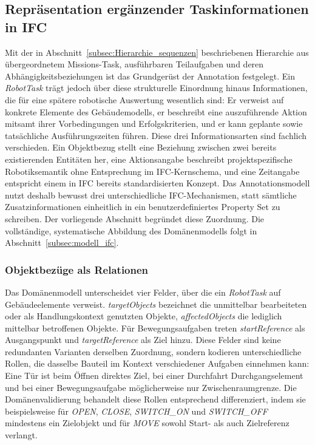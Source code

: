 \subsection{Repräsentation ergänzender Taskinformationen in IFC}\label{subsec:Taskinformationen}
Mit der in Abschnitt~\ref{subsec:Hierarchie_sequenzen} beschriebenen Hierarchie aus übergeordnetem Missions-Task, ausführbaren
Teilaufgaben und deren Abhängigkeitsbeziehungen ist das Grundgerüst der Annotation festgelegt. Ein
\textit{RobotTask} trägt jedoch über diese strukturelle Einordnung hinaus Informationen, die für
eine spätere robotische Auswertung wesentlich sind: Er verweist auf konkrete Elemente des
Gebäudemodells, er beschreibt eine auszuführende Aktion mitsamt ihrer Vorbedingungen und
Erfolgskriterien, und er kann geplante sowie tatsächliche Ausführungszeiten führen. Diese drei
Informationsarten sind fachlich verschieden. Ein Objektbezug stellt eine Beziehung zwischen zwei
bereits existierenden Entitäten her, eine Aktionsangabe beschreibt projektspezifische
Robotiksemantik ohne Entsprechung im IFC-Kernschema, und eine Zeitangabe entspricht einem in IFC
bereits standardisierten Konzept. Das Annotationsmodell nutzt deshalb bewusst drei unterschiedliche
IFC-Mechanismen, statt sämtliche Zusatzinformationen einheitlich in ein benutzerdefiniertes Property
Set zu schreiben. Der vorliegende Abschnitt begründet diese Zuordnung. Die vollständige,
systematische Abbildung des Domänenmodells folgt in Abschnitt~\ref{subsec:modell_ifc}.

\subsubsection{Objektbezüge als Relationen}
Das Domänenmodell unterscheidet vier Felder, über die ein \textit{RobotTask} auf Gebäudeelemente
verweist. \textit{targetObjects} bezeichnet die unmittelbar bearbeiteten oder als Handlungskontext
genutzten Objekte, \textit{affectedObjects} die lediglich mittelbar betroffenen Objekte. Für
Bewegungsaufgaben treten \textit{startReference} als Ausgangspunkt und \textit{targetReference} als
Ziel hinzu. Diese Felder sind keine redundanten Varianten derselben Zuordnung, sondern kodieren
unterschiedliche Rollen, die dasselbe Bauteil im Kontext verschiedener Aufgaben einnehmen kann: Eine
Tür ist beim Öffnen direktes Ziel, bei einer Durchfahrt Durchgangselement und bei einer
Bewegungsaufgabe möglicherweise nur Zwischenraumgrenze. Die Domänenvalidierung behandelt diese
Rollen entsprechend differenziert, indem sie beispielsweise für \textit{OPEN}, \textit{CLOSE},
\textit{SWITCH\_ON} und \textit{SWITCH\_OFF} mindestens ein Zielobjekt und für \textit{MOVE} sowohl
Start- als auch Zielreferenz verlangt.

